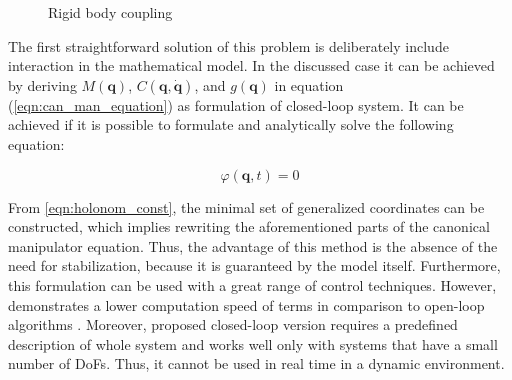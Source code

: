 \begin{figure}[H]
   \centering
   \caption{Rigid body coupling}
   \label{fig:rigid_coupling}
\end{figure}


The first straightforward solution of this problem is deliberately include 
interaction in the mathematical model. In the discussed case it can be achieved 
by deriving $M(\mathbf{q})$, $C(\mathbf{q}, \dot{\mathbf{q}})$, and 
$g(\mathbf{q})$ in equation (\ref{eqn:can_man_equation}) as formulation of 
closed-loop system. It can be achieved if it is possible to formulate and 
analytically solve the following equation:


\begin{equation}
   \label{eqn:holonom_const}
   \varphi (\mathbf{q}, t) = 0
\end{equation}


From \ref{eqn:holonom_const}, the minimal set of generalized coordinates can be 
constructed, which implies rewriting the aforementioned parts of the canonical 
manipulator equation. Thus, the advantage of this method is the absence of the need 
for stabilization, because it is guaranteed by the model itself. Furthermore, this 
formulation can be used with a great range of control techniques. However, 
\cite{BodyDynWithClosedLoop} demonstrates a lower computation speed of terms in 
comparison to open-loop algorithms \cite{Pinocchio}. Moreover, proposed closed-loop
version requires a predefined description of whole system and works well
only with systems that have a small number of DoFs. Thus, it cannot
be used in real time in a dynamic environment.


